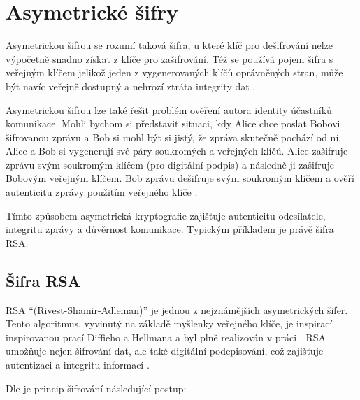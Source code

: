 \section{Asymetrické šifry}
Asymetrickou šifrou se rozumí taková šifra, u které klíč pro dešifrování nelze výpočetně snadno získat z klíče pro zašifrování. Též se používá pojem šifra s veřejným klíčem jelikož jeden z vygenerovaných klíčů oprávněných stran, může být navíc veřejně dostupný a nehrozí ztráta integrity dat \parencite{tesar2021}.

Asymetrickou šifrou lze také řešit problém ověření autora identity účastníků komunikace. Mohli bychom si představit situaci, kdy Alice chce poslat Bobovi šifrovanou zprávu a Bob si mohl být si jistý, že zpráva skutečně pochází od ní. Alice a Bob si vygenerují své páry soukromých a veřejných klíčů. Alice zašifruje zprávu svým soukromým klíčem (pro digitální podpis) a následně ji zašifruje Bobovým veřejným klíčem. Bob zprávu dešifruje svým soukromým klíčem a ověří autenticitu zprávy použitím veřejného klíče \parencite{burda2019}.

Tímto způsobem asymetrická kryptografie zajišťuje autenticitu odesílatele, integritu zprávy a důvěrnost komunikace. Typickým příkladem je právě šifra RSA.

\subsection{Šifra RSA}
RSA \enquote{(Rivest-Shamir-Adleman)} je jednou z nejznámějších asymetrických šifer. Tento algoritmus, vyvinutý na základě myšlenky veřejného klíče, je inspirací inspirovanou prací Diffieho a Hellmana \parencite{diffie1976} a byl plně realizován v práci \textcite{rsa1978}. RSA umožňuje nejen šifrování dat, ale také digitální podepisování, což zajišťuje autentizaci a integritu informací \parencite{tesar2021}.

Dle \textcite{rsa1978} je princip šifrování následující postup:

